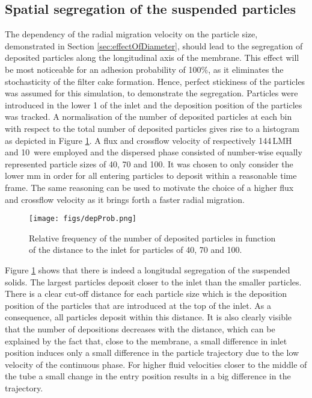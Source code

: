 \subsection{Spatial segregation of the suspended particles \label{sec:spatSeg}}
The dependency of the radial migration velocity on the particle size, demonstrated in Section \ref{sec:effectOfDiameter}, should lead to the segregation of deposited particles along the longitudinal axis of the membrane. This effect will be most noticeable for an adhesion probability of 100\%, as it eliminates the stochasticity of the filter cake formation. Hence, perfect stickiness of the particles was assumed for this simulation, to demonstrate the segregation. Particles were introduced in the lower \unit{1}{\milli\metre} of the inlet and the deposition position of the particles was tracked. A normalisation of the number of deposited particles at each bin with respect to the total number of deposited particles gives rise to a histogram as depicted in Figure \ref{fig:depProb}. A flux and crossflow velocity of respectively 144\,LMH and \unit{10}{\centi\metre\,\reciprocal\second} were employed and the dispersed phase consisted of number-wise equally represented particle sizes of 40, 70 and \unit{100}{\micro\metre}. It was chosen to only consider the lower \unit{\milli\metre} in order for all entering particles to deposit within a reasonable time frame. The same reasoning can be used to motivate the choice of a higher flux and crossflow velocity as it brings forth a faster radial migration. %
\begin{figure}[H]
 \centering
 \texttt{[image: figs/depProb.png]}
 \caption{Relative frequency of the number of deposited particles in function of the distance to the inlet for particles of 40, 70 and \unit{100}{\micro\metre}. \label{fig:depProb}}
\end{figure}
Figure \ref{fig:depProb} shows that there is indeed a longitudal segregation of the suspended solids. The largest particles deposit closer to the inlet than the smaller particles. There is a clear cut-off distance for each particle size which is the deposition position of the particles that are introduced at the top of the inlet. As a consequence, all particles deposit within this distance. It is also clearly visible that the number of depositions decreases with the distance, which can be explained by the fact that, close to the membrane, a small difference in inlet position induces only a small difference in the particle trajectory due to the low velocity of the continuous phase. For higher fluid velocities closer to the middle of the tube a small change in the entry position results in a big difference in the trajectory.\par
